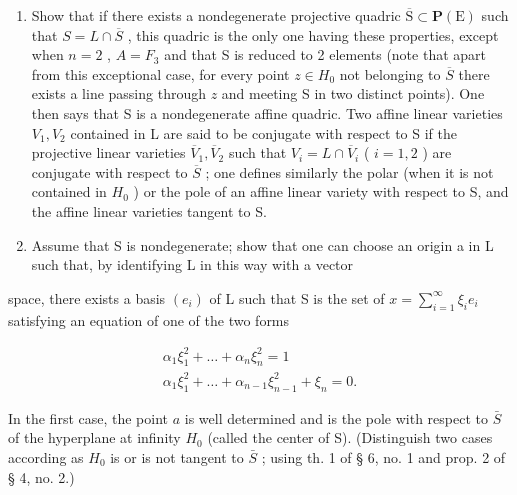 \begin{enumerate}
\def\labelenumi{\alph{enumi})}
\item
  Show that if there exists a nondegenerate projective quadric \(\overline{\mathrm{S}}\subset\mathbf{P}(\mathrm{E})\) such that \(S=L\cap\overline{S}\) , this quadric is the only one having these properties, except when \(n=2\) , \(A=F_{3}\) and that S is reduced to 2 elements (note that apart from this exceptional case, for every point \(z\in H_{0}\) not belonging to \(\overline{S}\) there exists a line passing through \(z\) and meeting S in two distinct points). One then says that S is a nondegenerate affine quadric. Two affine linear varieties \(V_{1},V_{2}\) contained in L are said to be conjugate with respect to S if the projective linear varieties \(\overline{V}_{1},\overline{V}_{2}\) such that \(V_{i}=L\cap\overline{V}_{i}\) ( \(i=1,2\) ) are conjugate with respect to \(\overline{S}\) ; one defines similarly the polar (when it is not contained in \(H_{0}\) ) or the pole of an affine linear variety with respect to S, and the affine linear varieties tangent to S.
\item
  Assume that S is nondegenerate; show that one can choose an origin a in L such that, by identifying L in this way with a vector
\end{enumerate}

space, there exists a basis \((e_i)\) of L such that S is the set of \(x = \sum_{i=1}^{\infty} \xi_i e_i\) satisfying an equation of one of the two forms

\[
\begin{array}{c} \alpha_ {1} \xi_ {1} ^ {2} + \dots + \alpha_ {n} \xi_ {n} ^ {2} = 1 \\ \alpha_ {1} \xi_ {1} ^ {2} + \dots + \alpha_ {n - 1} \xi_ {n - 1} ^ {2} + \xi_ {n} = 0. \end{array}
\]

In the first case, the point \(a\) is well determined and is the pole with respect to \(\bar{S}\) of the hyperplane at infinity \(H_{0}\) (called the center of S). (Distinguish two cases according as \(H_{0}\) is or is not tangent to \(\bar{S}\) ; using th. 1 of § 6, no. 1 and prop. 2 of § 4, no. 2.)

